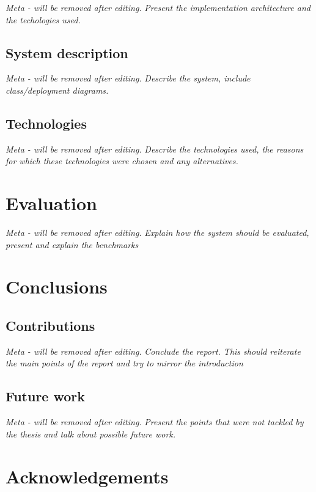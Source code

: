\documentclass[11pt,a4paper]{globis-book}
\begin{document}
\textit{Meta - will be removed after editing.}
\textit{Present the implementation architecture and the techologies used.}

\section{System description}
\textit{Meta - will be removed after editing.}
\textit{Describe the system, include class/deployment diagrams.}

\section{Technologies}
\textit{Meta - will be removed after editing.}
\textit{Describe the technologies used, the reasons for which these technologies were chosen and any alternatives.}

\chapter{Evaluation}
\label{ch:evaluation}

\textit{Meta - will be removed after editing.}
\textit{Explain how the system should be evaluated, present and explain the benchmarks}

\chapter{Conclusions}
\label{ch:conclusions}

\section{Contributions}
\label{sec:conclusions-contribution}
\textit{Meta - will be removed after editing.}
\textit{Conclude the report. This should reiterate the main points of the report and try to mirror the introduction}

\section{Future work}
\label{sec:conclusions-future-work}
\textit{Meta - will be removed after editing.}
\textit{Present the points that were not tackled by the thesis and talk about possible future work.}

\appendix

\listoffigures
\listoftables

\chapter*{Acknowledgements}

\newpage
\thispagestyle{empty}



\end{document}
